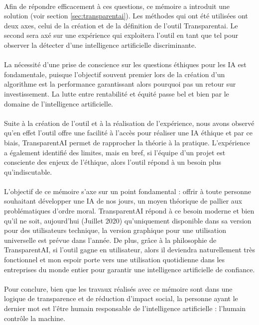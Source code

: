 \documentclass[10pt, french, a4paper]{report}
\begin{document}
\paragraph{}
Afin de répondre efficacement à ces questions, ce mémoire a introduit une solution (voir section \ref{sec:transparentai}). Les méthodes qui ont été utilisées ont deux axes, celui de la création et de la définition de l'outil Transparentai. Le second sera axé sur une expérience qui exploitera l'outil en tant que tel pour observer la détecter d'une intelligence artificielle discriminante.

\paragraph{}
La nécessité d’une prise de conscience sur les questions éthiques pour les IA est fondamentale, puisque l’objectif souvent premier lors de la création d’un algorithme est la performance garantissant alors pourquoi pas un retour sur investissement. La lutte entre rentabilité et équité passe bel et bien par le domaine de l’intelligence artificielle.

\paragraph{}
Suite à la création de l'outil et à la réalisation de l'expérience, nous avons observé qu'en effet l'outil offre une facilité à l'accès pour réaliser une IA éthique et par ce biais, TransparentAI permet de rapprocher la théorie à la pratique. L'expérience a également identifié des limites, mais en bref, si l'équipe d'un projet est consciente des enjeux de l'éthique, alors l'outil répond à un besoin plus qu'indiscutable.

\paragraph{}
L’objectif de ce mémoire s’axe sur un point fondamental : offrir à toute personne souhaitant développer une IA de nos jours, un moyen théorique de pallier aux problématiques d’ordre moral. TransparentAI répond à ce besoin moderne et bien qu'il ne soit, aujourd'hui (Juillet 2020) qu'uniquement disponible dans sa version pour des utilisateurs technique, la version graphique pour une utilisation universelle est prévue dans l'année. De plus, grâce à la philosophie de TransparentAI, si l'outil gagne en utilisateur, alors il deviendra naturellement très fonctionnel et mon espoir porte vers une utilisation quotidienne dans les entreprises du monde entier pour garantir une intelligence artificielle de confiance.

\paragraph{}
Pour conclure, bien que les travaux réalisés avec ce mémoire sont dans une logique de transparence et de réduction d’impact social, la personne ayant le dernier mot est l’être humain responsable de l’intelligence artificielle : l'humain contrôle la machine.

\newpage
% 


\end{document}
